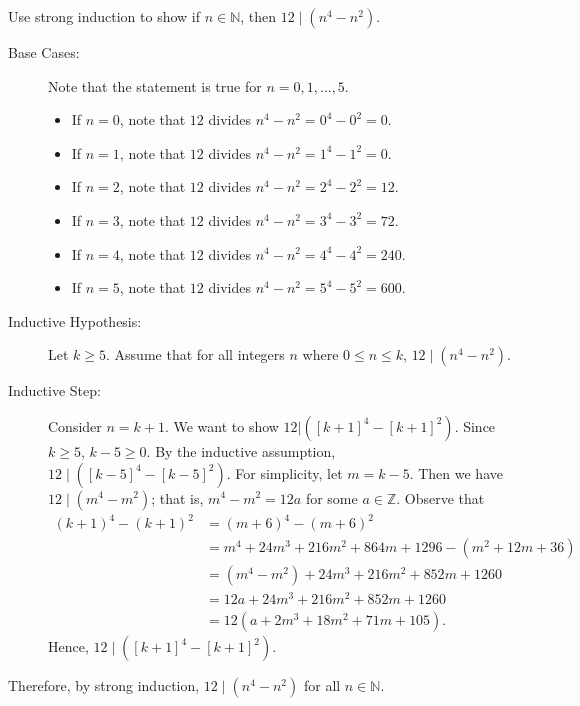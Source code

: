 \documentclass{article}
\newcommand{\Z}{\mathbb{Z}}
\theoremstyle{definition}
\begin{document}
\begin{question}
    Use strong induction to show if $n\in \mathbb{N}$, then $12 \mid (n^4-n^2)$.
\end{question}
\begin{solution}
	\begin{description}
	\item[Base Cases: ] Note that the statement is true for $n=0, 1, \dots, 5$.
	\begin{itemize}
	\item If $n=0$, note that $12$ divides $n^4-n^2=0^4-0^2=0$.
	\item If $n=1$, note that $12$ divides $n^4-n^2=1^4-1^2=0$.
	\item If $n=2$, note that $12$ divides $n^4-n^2=2^4-2^2=12$.
	\item If $n=3$, note that $12$ divides $n^4-n^2=3^4-3^2=72$.
	\item If $n=4$, note that $12$ divides $n^4-n^2=4^4-4^2=240$.
	\item If $n=5$, note that $12$ divides $n^4-n^2=5^4-5^2=600$.
	\end{itemize}
	
	\item[Inductive Hypothesis: ] Let $k\geq 5$. Assume that for all integers $n$ where $0\leq n\leq k$, $12\mid (n^4-n^2)$.
	
	\item[Inductive Step: ] Consider $n=k+1$.  We want to show $12|([k+1]^4-[k+1]^2)$. Since $k\geq 5$, $k-5\geq 0$. By the inductive assumption, $12 \mid ([k-5]^4-[k-5]^2)$. For simplicity, let $m=k-5$. Then we have $12\mid (m^4-m^2)$; that is, $m^4-m^2=12a$ for some $a\in \Z$. Observe that
	\begin{align*}
	(k+1)^4-(k+1)^2 & = (m+6)^4-(m+6)^2\\
				& = m^4+24m^3+216m^2+864m+1296 - (m^2+12m+36)\\
				& = (m^4-m^2) + 24m^3 + 216m^2 + 852m + 1260\\
				& = 12a + 24m^3 + 216m^2 + 852m + 1260\\
				& = 12 (a+2m^3+18m^2 +71m +105).
	\end{align*}
	Hence, $12\mid ([k+1]^4-[k+1]^2)$.
	\end{description}
	Therefore, by strong induction, $12 \mid (n^4-n^2)$ for all $n\in \mathbb{N}$.
\end{solution}
\end{document}
